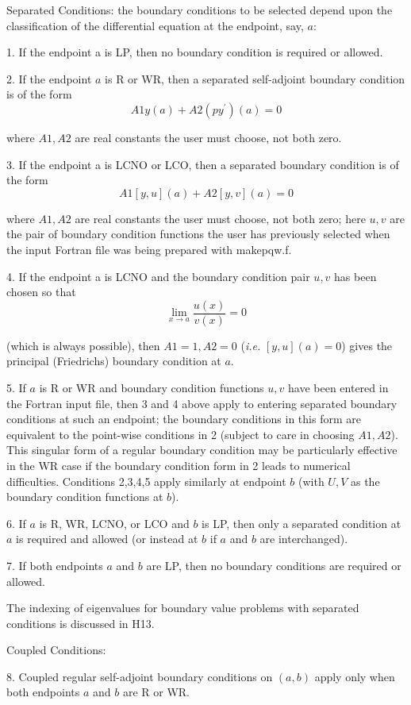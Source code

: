 \documentclass[12pt]{amsart}%
\theoremstyle{plain}
\numberwithin{equation}{section}
\numberwithin{theorem}{section}
\begin{document}
Separated Conditions: the boundary conditions to be selected depend upon the
classification of the differential equation at the endpoint, say, $a$:

1. If the endpoint a is LP, then no boundary condition is required or allowed.

2. If the endpoint $a$ is R or WR, then a separated self-adjoint boundary
condition is of the form%
\[
A1y(a)+A2(py^{\prime})(a)=0
\]

\noindent where $A1,A2$ are real constants the user must choose, not both zero.

3. If the endpoint a is LCNO or LCO, then a separated boundary condition is of
the form%
\[
A1[y,u](a)+A2[y,v](a)=0
\]

\noindent where $A1,A2$ are real constants the user must choose, not both
zero; here $u,v$ are the pair of boundary condition functions the user has
previously selected when the input Fortran file was being prepared with makepqw.f.

4. If the endpoint a is LCNO and the boundary condition pair $u,v$ has been
chosen so that%
\[
\lim_{x\rightarrow a}\frac{u(x)}{v(x)}=0
\]

\noindent(which is always possible), then $A1=1,A2=0$ (\textit{i.e.
}$[y,u](a)=0$) gives the principal (Friedrichs) boundary condition at $a.$

5. If $a$ is R or WR and boundary condition functions $u,v$ have been entered
in the Fortran input file, then 3 and 4 above apply to entering separated
boundary conditions at such an endpoint; the boundary conditions in this form
are equivalent to the point-wise conditions in 2 (subject to care in choosing
$A1,A2$). This singular form of a regular boundary condition may be
particularly effective in the WR case if the boundary condition form in 2
leads to numerical difficulties. Conditions 2,3,4,5 apply similarly at
endpoint $b$ (with $U,V$ as the boundary condition functions at $b$).

6. If $a$ is R, WR, LCNO, or LCO and $b$ is LP, then only a separated
condition at $a$ is required and allowed (or instead at $b$ if $a$ and $b$ are interchanged).

7. If both endpoints $a$ and $b$ are LP, then no boundary conditions are
required or allowed.

The indexing of eigenvalues for boundary value problems with separated
conditions is discussed in H13.

Coupled Conditions:

8. Coupled regular self-adjoint boundary conditions on $(a,b)$ apply only when
both endpoints $a$ and $b$ are R or WR.
\end{document}
